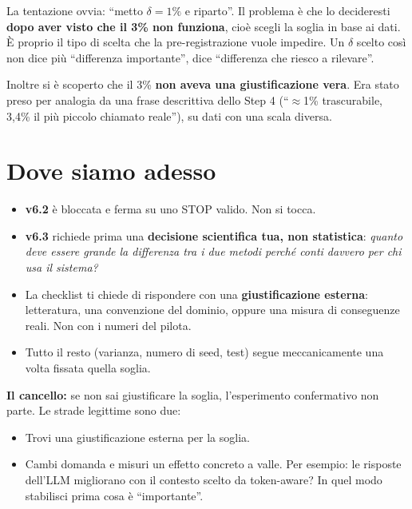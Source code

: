 \documentclass[11pt,a4paper]{article}
\begin{document}
La tentazione ovvia: ``metto $\delta = 1\%$ e riparto''. Il problema è che lo decideresti \textbf{dopo aver visto che il 3\% non funziona}, cioè scegli la soglia in base ai dati. È proprio il tipo di scelta che la pre-registrazione vuole impedire. Un $\delta$ scelto così non dice più ``differenza importante'', dice ``differenza che riesco a rilevare''.

Inoltre si è scoperto che il 3\% \textbf{non aveva una giustificazione vera}. Era stato preso per analogia da una frase descrittiva dello Step 4 (``$\approx$1\% trascurabile, 3,4\% il più piccolo chiamato reale''), su dati con una scala diversa.

\section{Dove siamo adesso}

\begin{itemize}
  \item \textbf{v6.2} è bloccata e ferma su uno STOP valido. Non si tocca.
  \item \textbf{v6.3} richiede prima una \textbf{decisione scientifica tua, non statistica}: \emph{quanto deve essere grande la differenza tra i due metodi perché conti davvero per chi usa il sistema?}
  \item La checklist ti chiede di rispondere con una \textbf{giustificazione esterna}: letteratura, una convenzione del dominio, oppure una misura di conseguenze reali. Non con i numeri del pilota.
  \item Tutto il resto (varianza, numero di seed, test) segue meccanicamente una volta fissata quella soglia.
\end{itemize}

\begin{nota}
\textbf{Il cancello:} se non sai giustificare la soglia, l'esperimento confermativo non parte. Le strade legittime sono due:
\begin{itemize}
  \item[\textbf{A.}] Trovi una giustificazione esterna per la soglia.
  \item[\textbf{B.}] Cambi domanda e misuri un effetto concreto a valle. Per esempio: le risposte dell'LLM migliorano con il contesto scelto da token-aware? In quel modo stabilisci prima cosa è ``importante''.
\end{itemize}
\end{nota}
\end{document}
